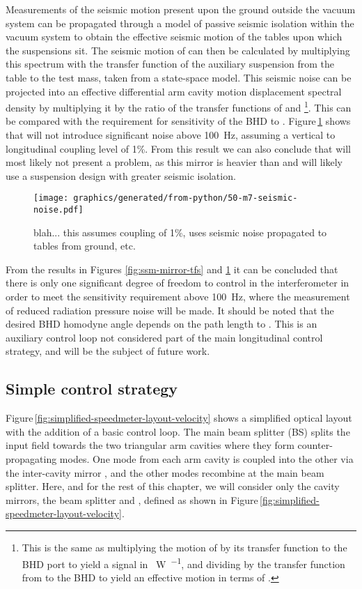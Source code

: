 Measurements of the seismic motion present upon the ground outside the vacuum system can be propagated through a model of passive seismic isolation within the vacuum system to obtain the effective seismic motion of the tables upon which the suspensions sit. The seismic motion of \MSEVEN{} can then be calculated by multiplying this spectrum with the transfer function of the auxiliary suspension from the table to the test mass, taken from a state-space model. This seismic noise can be projected into an effective differential arm cavity motion displacement spectral density by multiplying it by the ratio of the transfer functions of \MSEVEN{} and \LMINUS{}\footnote{This is the same as multiplying the motion of \MSEVEN{} by its transfer function to the \gls{BHD} port to yield a signal in \SI{}{\watt\per\sqrthz}, and dividing by the transfer function from \LMINUS{} to the \gls{BHD} to yield an effective motion in terms of \LMINUS{}.}. This can be compared with the requirement for sensitivity of the \gls{BHD} to \LMINUS{}. Figure\,\ref{fig:m7-seismic-noise} shows that \MSEVEN{} will not introduce significant noise above \SI{100}{\hertz}, assuming a vertical to longitudinal coupling level of 1\%. From this result we can also conclude that \MSIX{} will most likely not present a problem, as this mirror is heavier than \MSEVEN{} and will likely use a suspension design with greater seismic isolation.

\begin{figure}
  \centering
  \texttt{[image: graphics/generated/from-python/50-m7-seismic-noise.pdf]}
  \caption{\label{fig:m7-seismic-noise}blah... this assumes coupling of 1\%, uses seismic noise propagated to tables from ground, etc.}
\end{figure}

From the results in Figures \ref{fig:ssm-mirror-tfs} and \ref{fig:m7-seismic-noise} it can be concluded that there is only one significant degree of freedom to control in the interferometer in order to meet the sensitivity requirement above \SI{100}{\hertz}, where the measurement of reduced radiation pressure noise will be made. It should be noted that the desired \gls{BHD} homodyne angle depends on the path length \MELEVEN{} to \MSIXTEEN{}. This is an auxiliary control loop not considered part of the main longitudinal control strategy, and will be the subject of future work.

\subsection{\label{sec:velocity-control}Simple control strategy}
Figure\,\ref{fig:simplified-speedmeter-layout-velocity} shows a simplified optical layout with the addition of a basic control loop. The main beam splitter (BS) splits the input field towards the two triangular arm cavities where they form counter-propagating modes. One mode from each arm cavity is coupled into the other via the inter-cavity mirror \MINT{}, and the other modes recombine at the main beam splitter. Here, and for the rest of this chapter, we will consider only the cavity mirrors, the beam splitter and \MINT{}, defined as shown in Figure\,\ref{fig:simplified-speedmeter-layout-velocity}.

